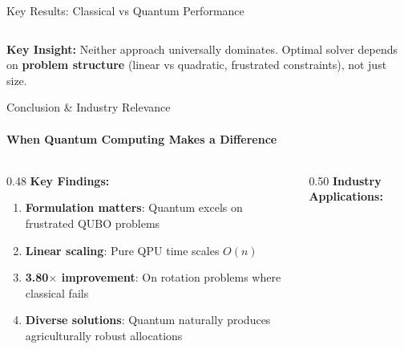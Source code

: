 \documentclass[aspectratio=169,10pt]{beamer}
\begin{document}
\begin{frame}{Key Results: Classical vs Quantum Performance}
\begin{columns}[T]
\end{columns}

\vspace{0.3cm}
\begin{keybox}
\centering
\small\textbf{Key Insight:} Neither approach universally dominates. Optimal solver depends on \textbf{problem structure} (linear vs quadratic, frustrated constraints), not just size.
\end{keybox}
\end{frame}

\begin{frame}{Conclusion \& Industry Relevance}
    \framesubtitle{When Quantum Computing Makes a Difference}
    
    \begin{columns}[T]
        \begin{column}{0.48\textwidth}
            \textbf{Key Findings:}
            \begin{enumerate}\footnotesize
                \item \textcolor{primaryBlue}{\textbf{Formulation matters}}: Quantum excels on frustrated QUBO problems
                \item \textcolor{accentTeal}{\textbf{Linear scaling}}: Pure QPU time scales $O(n)$
                \item \textcolor{accentGreen}{\textbf{3.80$\times$ improvement}}: On rotation problems where classical fails
                \item \textcolor{warmOrange}{\textbf{Diverse solutions}}: Quantum naturally produces agriculturally robust allocations
            \end{enumerate}
            
            \vspace{0.3cm}
            
        \end{column}
        
        \begin{column}{0.50\textwidth}
            \textbf{Industry Applications:}
            
            

\end{column}
\end{columns}
\end{frame}
\end{document}
